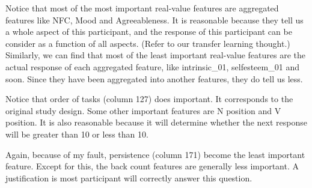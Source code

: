 \documentclass[11pt, a4paper]{article}
\begin{document}
\begin{enumerate}
\begin{itemize}
{			Notice that most of the most important real-value features are aggregated features like NFC, Mood and Agreeableness. It is reasonable because they tell us a whole aspect of this participant, and the response of this participant can be consider as a function of all aspects. (Refer to our transfer learning thought.) Similarly, we can find that most of the least important real-value features are the actual response of each aggregated feature, like intrinsic\_01, selfesteem\_01 and soon. Since they have been aggregated into another features, they do tell us less.
			
			Notice that order of tasks (column 127) does important. It corresponds to the original study design. Some other important features are N position and V position. It is also reasonable because it will determine whether the next response will be greater than 10 or less than 10.
			
			Again, because of my fault, persistence (column 171) become the least important feature. Except for this, the back count features are generally less important. A justification is most participant will correctly answer this question.}
		

\end{itemize}
\end{enumerate}
\end{document}
